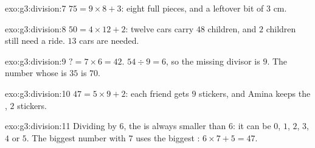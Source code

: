 \begin{solution}{exo:g3:division:7}
$75 = 9 \times 8 + 3$: eight full pieces, and a leftover bit of
$3$ cm.
\end{solution}

\begin{solution}{exo:g3:division:8}
$50 = 4 \times 12 + 2$: twelve cars carry $48$ children, and $2$
children still need a ride. $13$ cars are needed.
\end{solution}

\begin{solution}{exo:g3:division:9}
$? = 7 \times 6 = 42$. \quad
$54 \div 9 = 6$, so the missing divisor is $9$. \quad
The number whose  is $35$ is $70$.
\end{solution}

\begin{solution}{exo:g3:division:10}
$47 = 5 \times 9 + 2$: each friend gets $9$ stickers, and Amina
keeps the , $2$ stickers.
\end{solution}

\begin{solution}{exo:g3:division:11}
Dividing by $6$, the  is always smaller than $6$: it can be
$0$, $1$, $2$, $3$, $4$ or $5$. The biggest number with  $7$
uses the biggest : $6 \times 7 + 5 = 47$.
\end{solution}
